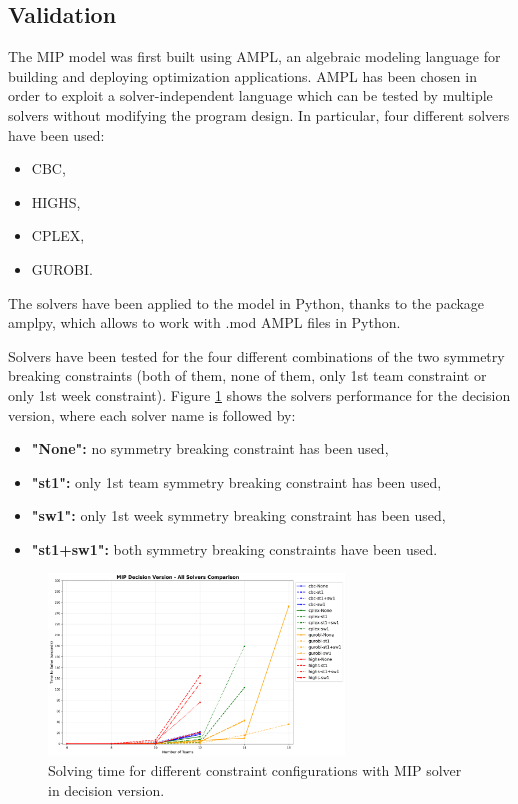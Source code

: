 \documentclass{article}
\begin{document}
\subsection{Validation}
The MIP model was first built using AMPL, an algebraic modeling language for building and deploying optimization applications. AMPL has been chosen in order to exploit a solver-independent language which can be tested by multiple solvers without modifying the program design. In particular, four different solvers have been used:

\begin{itemize}
    \item CBC,
    \item HIGHS,
    \item CPLEX, 
    \item GUROBI.
\end{itemize}

The solvers have been applied to the model in Python, thanks to the package amplpy, which allows to work with .mod AMPL files in Python.

Solvers have been tested for the four different combinations of the two symmetry breaking constraints (both of them, none of them, only 1st team constraint or only 1st week constraint). Figure \ref{fig:MIP_dec} shows the solvers performance for the decision version, where each solver name is followed by:

\begin{itemize}
    \item \textbf{"None":} no symmetry breaking constraint has been used,
    \item \textbf{"st1":} only 1st team symmetry breaking constraint has been used,
    \item \textbf{"sw1":} only 1st week symmetry breaking constraint has been used, 
    \item \textbf{"st1+sw1":} both symmetry breaking constraints have been used.
\end{itemize}

\begin{figure}[H]
    \centering
    \includegraphics[width=0.7\textwidth]{../plots/MIP_decision.png}
    \caption{Solving time for different constraint configurations with MIP solver in decision version.}
    \label{fig:MIP_dec}
\end{figure}
\end{document}
